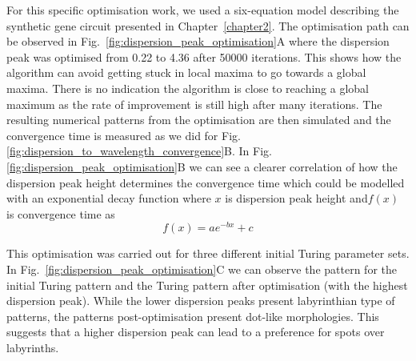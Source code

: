 For this specific optimisation work, we used a six-equation model describing the synthetic gene circuit presented in Chapter~\ref{chapter2}.
The optimisation path can be observed in Fig.~\ref{fig:dispersion_peak_optimisation}A where the dispersion peak was optimised from 0.22 to 4.36 after 50000 iterations.
This shows how the algorithm can avoid getting stuck in local maxima to go towards a global maxima.
There is no indication the algorithm is close to reaching a global maximum as the rate of improvement is still high after many iterations.
The resulting numerical patterns from the optimisation are then simulated and the convergence time is measured as we did for Fig. \ref{fig:dispersion_to_wavelength_convergence}B. In Fig. \ref{fig:dispersion_peak_optimisation}B we can see a clearer correlation of how the dispersion peak height determines the convergence time which could be modelled with an exponential decay function where $x$ is dispersion peak height and$ f(x)$ is convergence time as
\begin{equation}
    f(x) = ae^{-bx} + c
\end{equation}


This optimisation was carried out for three different initial Turing parameter sets. In Fig.~\ref{fig:dispersion_peak_optimisation}C we can observe the pattern for the initial Turing pattern and the Turing pattern after optimisation (with the highest dispersion peak).
While the lower dispersion peaks present labyrinthian type of patterns, the patterns post-optimisation present dot-like morphologies.
This suggests that a higher dispersion peak can lead to a preference for spots over labyrinths.


